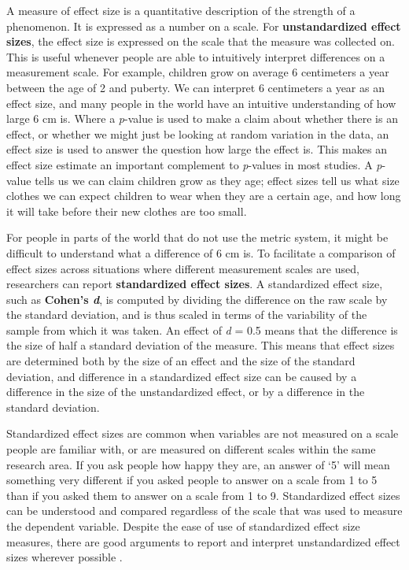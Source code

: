 \documentclass[
  oneside]{krantz}
\begin{document}
A measure of effect size is a quantitative description of the strength of a phenomenon. It is expressed as a number on a scale. For \textbf{unstandardized effect sizes}, the effect size is expressed on the scale that the measure was collected on. This is useful whenever people are able to intuitively interpret differences on a measurement scale. For example, children grow on average 6 centimeters a year between the age of 2 and puberty. We can interpret 6 centimeters a year as an effect size, and many people in the world have an intuitive understanding of how large 6 cm is. Where a \emph{p}-value is used to make a claim about whether there is an effect, or whether we might just be looking at random variation in the data, an effect size is used to answer the question how large the effect is. This makes an effect size estimate an important complement to \emph{p}-values in most studies. A \emph{p}-value tells us we can claim children grow as they age; effect sizes tell us what size clothes we can expect children to wear when they are a certain age, and how long it will take before their new clothes are too small.

For people in parts of the world that do not use the metric system, it might be difficult to understand what a difference of 6 cm is. To facilitate a comparison of effect sizes across situations where different measurement scales are used, researchers can report \textbf{standardized effect sizes}. A standardized effect size, such as \textbf{Cohen's \emph{d}}, is computed by dividing the difference on the raw scale by the standard deviation, and is thus scaled in terms of the variability of the sample from which it was taken. An effect of \emph{d} = 0.5 means that the difference is the size of half a standard deviation of the measure. This means that effect sizes are determined both by the size of an effect and the size of the standard deviation, and difference in a standardized effect size can be caused by a difference in the size of the unstandardized effect, or by a difference in the standard deviation.

Standardized effect sizes are common when variables are not measured on a scale people are familiar with, or are measured on different scales within the same research area. If you ask people how happy they are, an answer of `5' will mean something very different if you asked people to answer on a scale from 1 to 5 than if you asked them to answer on a scale from 1 to 9. Standardized effect sizes can be understood and compared regardless of the scale that was used to measure the dependent variable. Despite the ease of use of standardized effect size measures, there are good arguments to report and interpret unstandardized effect sizes wherever possible \citep{baguley_standardized_2009}.
\end{document}
